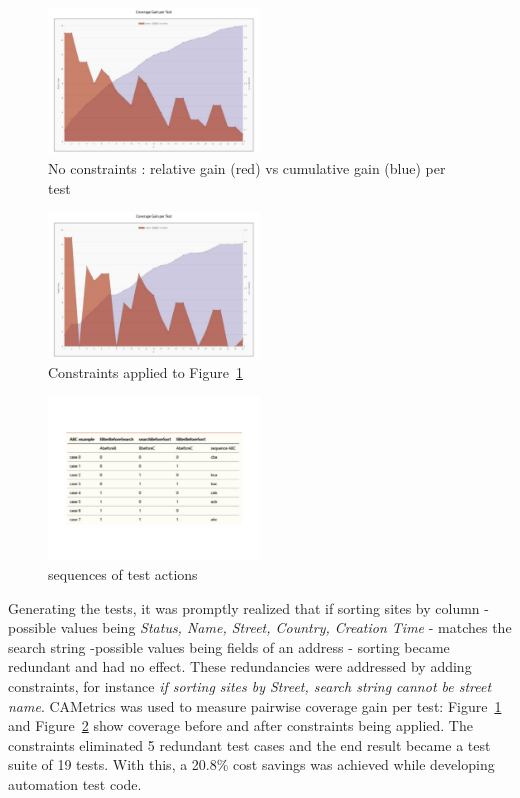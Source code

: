 \documentclass[conference]{IEEEtran}
\begin{document}
	\begin{figure}[!t]
		\includegraphics[width=0.50\textwidth,]{coverageGainPerTest.pdf}
		\caption{No constraints : relative gain (red) vs cumulative gain (blue) per test}
		\label{fig:coverageGainPerTest}
	\end{figure}

	\begin{figure}[!t]
		\includegraphics[width=0.50\textwidth,]{coverageGainPerTest_withConstraints.pdf}
		\caption{Constraints applied to Figure~\ref{fig:coverageGainPerTest}}
		\label{fig:coverageGainPerTest_withConstraints}
	\end{figure}

	\begin{figure}[!b]
		\includegraphics[width=0.50\textwidth,]{sorting.pdf}
		\caption{sequences of test actions}
		\label{fig:sorting}
	\end{figure}

	Generating the tests, it was promptly realized that if sorting sites by column - possible values being \textit{Status, Name, Street, Country, Creation Time} - matches the search string -possible values being fields of an address - sorting became redundant and had no effect.
	These redundancies were addressed by adding constraints, for instance \textit{if sorting sites by Street, search string cannot be street name}. 
	CAMetrics was used to measure pairwise coverage gain per test: Figure~\ref{fig:coverageGainPerTest} and Figure~\ref{fig:coverageGainPerTest_withConstraints} show coverage before and after constraints being applied.
	The constraints eliminated 5 redundant test cases and the end result became a test suite of 19 tests. With this, a 20.8\% cost savings was achieved while developing automation test code.
	
\end{document}
